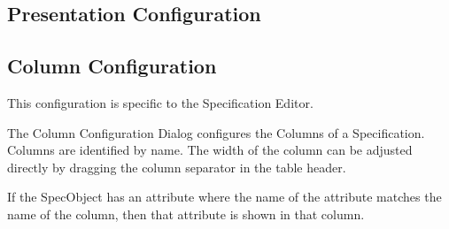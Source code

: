 \subsection{Presentation Configuration}
\label{sec:presentation_configuration}

\subsection{Column Configuration}
\label{sec:column_configuration}

This configuration is specific to the Specification Editor.

The Column Configuration Dialog configures the Columns of a
Specification.  Columns are identified by name.  The width of the column
can be adjusted directly by dragging the column separator in the table
header.

If the SpecObject has an attribute where the name of the attribute
matches the name of the column, then that attribute is shown in that
column.
